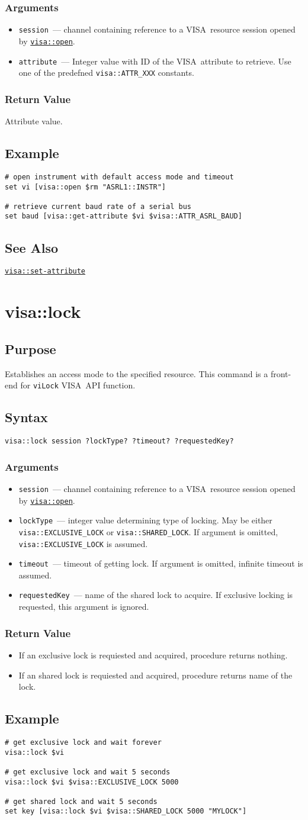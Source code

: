 \documentclass[12pt, a4paper]{book}
\newcommand{\VISA}{\mbox{VISA }}
\newcommand{\COMMANDREF}[1]{{\tt \hyperref[#1]{#1}}}
\newcommand{\VISACOMMANDREF}[1]{{\tt \mbox{#1}}\index{#1}}
\newcommand{\SEEALSO}{\subsection{See Also}}
\newcommand{\EXAMPLE}{\subsection{Example}}
\newcommand{\PURPOSE}{\subsection{Purpose}}
\newcommand{\SYNTAX}[1]{\subsection{Syntax}{\tt #1}}
\newcommand{\ARGUMENTS}{\subsubsection{Arguments}}
\newcommand{\RETURN}{\subsubsection{Return Value}}
\newcommand{\COMMAND}[1]{\section{#1}\label{#1}}
\newcommand{\BEGINARGUMENTS}{\ARGUMENTS\begin{itemize}}
\newcommand{\ENDARGUMENTS}{\end{itemize}}
\newcommand{\ARGUMENT}[1]{\item {\tt \mbox{#1}}~---}
\newcommand{\ARGCHANNEL}{\ARGUMENT{session} channel containing reference to a \VISA resource session opened by \COMMANDREF{visa::open}.}
\begin{document}
\BEGINARGUMENTS
\ARGCHANNEL
\ARGUMENT{attribute} Integer value with ID of the \VISA attribute to retrieve. Use one of the predefned {\tt visa::ATTR\_XXX} constants.
\ENDARGUMENTS

\RETURN

Attribute value.

\EXAMPLE

\begin{verbatim} 
# open instrument with default access mode and timeout
set vi [visa::open $rm "ASRL1::INSTR"]

# retrieve current baud rate of a serial bus
set baud [visa::get-attribute $vi $visa::ATTR_ASRL_BAUD]
\end{verbatim} 

\SEEALSO

\COMMANDREF{visa::set-attribute}


\COMMAND{visa::lock}

\PURPOSE

Establishes an access mode to the specified resource. This command is a front-end for \VISACOMMANDREF{viLock} \VISA API function.

\SYNTAX{visa::lock session ?lockType? ?timeout? ?requestedKey?}

\BEGINARGUMENTS
\ARGCHANNEL
\ARGUMENT{lockType} integer value determining type of locking. May be either {\tt visa::EXCLUSIVE\_LOCK} or {\tt visa::SHARED\_LOCK}. If argument is omitted, {\tt visa::EXCLUSIVE\_LOCK} is assumed.
\ARGUMENT{timeout} timeout of getting lock. If argument is omitted, infinite timeout is assumed.
\ARGUMENT{requestedKey} name of the shared lock to acquire. If exclusive locking is requested, this argument is ignored.
\ENDARGUMENTS

\RETURN

\begin{itemize}
\item If an exclusive lock is requiested and acquired, procedure returns nothing.
\item If an shared lock is requiested and acquired, procedure returns name of the lock.
\end{itemize}

\EXAMPLE

\begin{verbatim} 
# get exclusive lock and wait forever
visa::lock $vi

# get exclusive lock and wait 5 seconds
visa::lock $vi $visa::EXCLUSIVE_LOCK 5000

# get shared lock and wait 5 seconds
set key [visa::lock $vi $visa::SHARED_LOCK 5000 "MYLOCK"]
\end{verbatim} 
\end{document}
